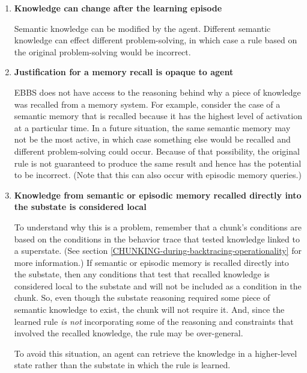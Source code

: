 \begin{enumerate}
	\item \textbf{Knowledge can change after the learning episode} \hfill

	Semantic knowledge can be modified by the agent.  Different semantic knowledge can effect different problem-solving, in which case a rule based on the original problem-solving would be incorrect.

	\item \textbf{Justification for a memory recall is opaque to agent} \hfill

	EBBS does not have access to the reasoning behind why a piece of knowledge was recalled from a memory system.  For example, consider the case of a semantic memory that is recalled because it has the highest level of activation at a particular time.  In a future situation, the same semantic memory may not be the most active, in which case something else would be recalled and different problem-solving could occur.  Because of that possibility, the original rule is not guaranteed to produce the same result and hence has the potential to be incorrect.  (Note that this can also occur with episodic memory queries.)

	\item \textbf{Knowledge from semantic or episodic memory recalled directly into the substate is considered local} \hfill

	To understand why this is a problem, remember that a chunk's conditions are based on the conditions in the behavior trace that tested knowledge linked to a superstate.  (See section \ref{CHUNKING-during-backtracing-operationality} for more information.) If semantic or episodic memory is recalled directly into the substate, then any conditions that test that recalled knowledge is considered local to the substate and will not be included as a condition in the chunk.  So, even though the substate reasoning required some piece of semantic knowledge to exist, the chunk will not require it.  And, since the learned rule \textit{is not} incorporating some of the reasoning and constraints that involved the recalled knowledge, the rule may be over-general.

	To avoid this situation, an agent can retrieve the knowledge in a higher-level state rather than the substate in which the rule is learned.
\end{enumerate}

